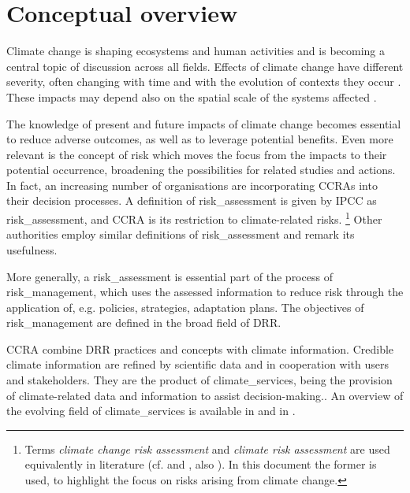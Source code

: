 \section{Conceptual overview}
\label{sec:Conceptual overview}
Climate change is shaping ecosystems and human activities and is becoming a central topic of discussion across all fields\cite{2022PortnerClimateChange,2022PortnerTechnicalSummary}. Effects of climate change have different severity, often changing with time and with the evolution of contexts they occur \cite{2024EEAExecutiveSummary}. These impacts may depend also on the spatial scale of the systems affected \cite{2021Doblas-ReyesLinkingGlobal}.

The knowledge of present and future impacts of climate change becomes essential to reduce adverse outcomes, as well as to leverage potential benefits. Even more relevant is the concept of risk which moves the focus from the impacts to their potential occurrence, broadening the possibilities for related studies and actions.
In fact, an increasing number of organisations are incorporating \glspl{CCRA} into their decision processes\cite{2024Carlin2024Climate}. A definition of \gls{risk_assessment} is given by \gls{IPCC} as \glsdesc{risk_assessment}, and \gls{CCRA} is its restriction to climate-related \glspl{risk}.%
\footnote{Terms \emph{climate change risk assessment} and \emph{climate risk assessment} are used equivalently in literature (cf. \cite[11]{2017GIZRiskSupplement} and \cite[20]{2017GIZTheVulnerability}, also \cite{2024LoyerInventoryOf}). In this document the former is used, to highlight the focus on risks arising from climate change.}
Other authorities employ similar definitions of \gls{risk_assessment} and remark its usefulness.\cite{2021ISO14091,2019UNDRRGlobalAssessment}

More generally, a \gls{risk_assessment} is essential part of the process of \gls{risk_management}, which uses the assessed information to reduce risk through the application of, e.g. policies, strategies, adaptation plans.\cite{2018ISO31000} The objectives of \gls{risk_management} are defined in the broad field of \gls{DRR}.\cite{2016UNSecretary-GeneralReportOf}

\Gls{CCRA} combine \gls{DRR} practices and concepts with climate information.\cite{2017GIZRiskSupplement,2012FieldManagingThe} Credible climate information are refined by scientific data and in cooperation with users and stakeholders. They are the product of \glspl{climate_service}, being the provision of climate-related data and information to assist decision-making.\cite{2012HewittTheGlobal}. An overview of the evolving field of \glspl{climate_service} is available in \cite[1431-1433]{2021Doblas-ReyesLinkingGlobal} and in \cite[1862-1869]{2021RanasingheClimateChange}.


